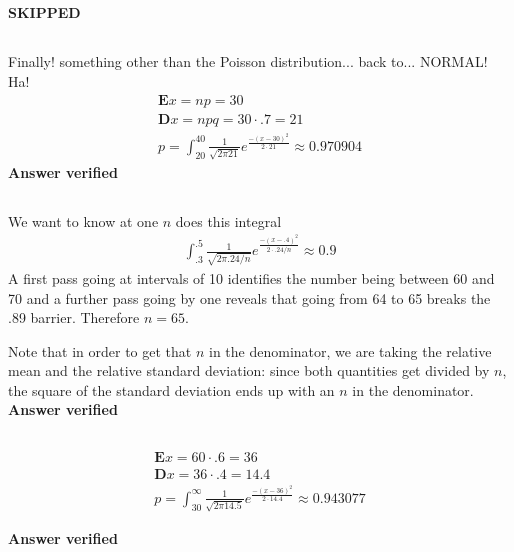 \subsection{}

\textbf{SKIPPED}

\subsection{}
Finally! something other than the Poisson distribution... back to... NORMAL!  Ha!
\begin{eqnarray}
	\textbf{E}x = np = 30 \\
	\textbf{D}x = npq = 30\cdot .7 = 21 \\
	p = \int_{20}^{40} \frac{1}{\sqrt{2 \pi 21}} e^{\frac{-(x-30)^2}{2 \cdot 21}} \approx 0.970904
\end{eqnarray}
\textbf{Answer verified}


\subsection{}
We want to know at one $n$ does this integral
\begin{eqnarray}
	\int_{.3}^{.5} \frac{1}{\sqrt{2 \pi .24/n}} e^{\frac{-(x-.4)^2}{2 \cdot .24/n}} \approx 0.9
\end{eqnarray}
A first pass going at intervals of 10 identifies the number being between 60 and 70 and a further pass going by one reveals that going from 64 to 65 breaks the .89 barrier.  Therefore $n=65$.

Note that in order to get that $n$ in the denominator, we are taking the relative mean and the relative standard deviation: since both quantities get divided by $n$, the square of the standard deviation ends up with an $n$ in the denominator.
\textbf{Answer verified}

\subsection{}

\begin{eqnarray}
	\textbf{E}x = 60 \cdot .6 = 36 \\
	\textbf{D}x = 36 \cdot .4 = 14.4 \\
	p = \int_{30}^{\infty} \frac{1}{\sqrt{2 \pi 14.5}} e^{\frac{-(x-36)^2}{2 \cdot 14.4}} \approx 0.943077
\end{eqnarray}

\textbf{Answer verified}

